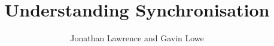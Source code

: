 \documentclass[12pt,a4paper]{article}
\title{Understanding Synchronisation}
\author{Jonathan Lawrence and Gavin Lowe}
\begin{document}
\maketitle

\begin{abstract}
\framebox{\ldots}
\end{abstract}









\end{document}
